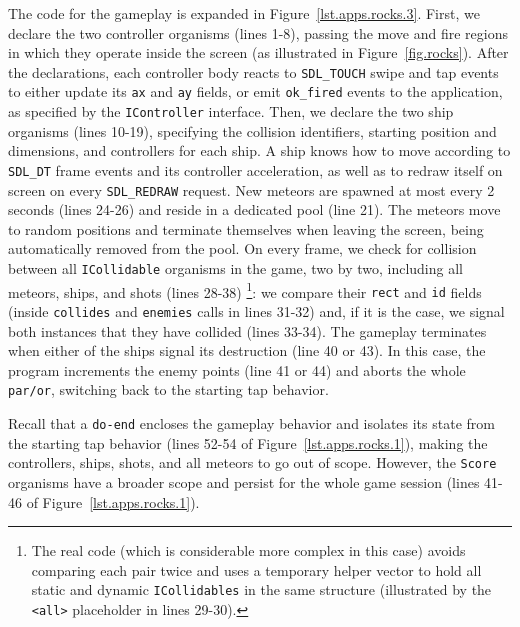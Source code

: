 \documentclass{sigplanconf}
\newcommand{\code}[1] {{\small{\texttt{#1}}}}
\newcommand{\1}{\;}
\newcommand{\2}{\;\;}
\newcommand{\3}{\;\;\;}
\newcommand{\5}{\;\;\;\;\;}
\begin{document}
The code for the gameplay is expanded in Figure~\ref{lst.apps.rocks.3}.
%
First, we declare the two controller organisms (lines 1-8), passing the move 
and fire regions in which they operate inside the screen (as illustrated in 
Figure~\ref{fig.rocks}).
After the declarations, each controller body reacts to \code{SDL\_TOUCH} swipe 
and tap events to either update its \code{ax} and \code{ay} fields, or emit 
\code{ok\_fired} events to the application, as specified by the 
\code{IController} interface.
%
Then, we declare the two ship organisms (lines 10-19), specifying the collision 
identifiers, starting position and dimensions, and controllers for each ship.
A ship knows how to move according to \code{SDL\_DT} frame events and its 
controller acceleration, as well as to redraw itself on screen on every 
\code{SDL\_REDRAW} request.
%
New meteors are spawned at most every 2 seconds (lines 24-26) and reside in a 
dedicated pool (line 21).
The meteors move to random positions and terminate themselves when leaving the 
screen, being automatically removed from the pool.
%
On every frame, we check for collision between all \code{ICollidable} organisms 
in the game, two by two, including all meteors, ships, and shots (lines 
28-38)%
\footnote{
The real code (which is considerable more complex in this case) avoids 
comparing each pair twice and uses a temporary helper vector to hold all static 
and dynamic \code{ICollidables} in the same structure (illustrated by the 
\code{<all>} placeholder in lines 29-30).
}:
we compare their \code{rect} and \code{id} fields (inside \code{collides} and 
\code{enemies} calls in lines 31-32) and, if it is the case, we signal both
instances that they have collided (lines 33-34).
%
The gameplay terminates when either of the ships signal its destruction (line
40 or 43).
In this case, the program increments the enemy points (line 41 or 44) and 
aborts the whole \code{par/or}, switching back to the starting tap behavior.

Recall that a \code{do-end} encloses the gameplay behavior and isolates its 
state from the starting tap behavior (lines 52-54 of 
Figure~\ref{lst.apps.rocks.1}), making the controllers, ships, shots, and all 
meteors to go out of scope.
However, the \code{Score} organisms have a broader scope and persist for the 
whole game session (lines 41-46 of Figure~\ref{lst.apps.rocks.1}).
\end{document}
